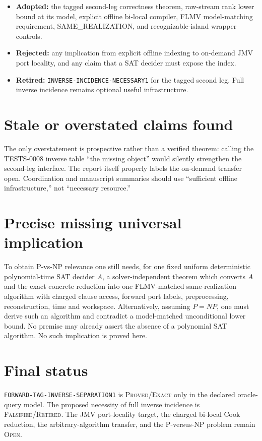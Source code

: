 \documentclass[11pt]{article}
\newcommand{\status}[1]{\textsc{#1}}
\begin{document}
\begin{itemize}[leftmargin=1.5em]
\item \textbf{Adopted:} the tagged second-leg correctness theorem, raw-stream
rank lower bound at its model, explicit offline bi-local compiler, FLMV
model-matching requirement, SAME\_REALIZATION, and recognizable-island
wrapper controls.
\item \textbf{Rejected:} any implication from explicit offline indexing to
on-demand JMV port locality, and any claim that a SAT decider must expose the
index.
\item \textbf{Retired:} \texttt{INVERSE-INCIDENCE-NECESSARY1} for the tagged
second leg.  Full inverse incidence remains optional useful infrastructure.
\end{itemize}

\section{Stale or overstated claims found}

The only overstatement is prospective rather than a verified theorem:
calling the TESTS-0008 inverse table ``the missing object'' would silently
strengthen the second-leg interface.  The report itself properly labels the
on-demand transfer open.  Coordination and manuscript summaries should use
``sufficient offline infrastructure,'' not ``necessary resource.''

\section{Precise missing universal implication}

To obtain P-vs-NP relevance one still needs, for one fixed uniform
deterministic polynomial-time SAT decider $A$, a solver-independent theorem
which converts $A$ and the exact concrete reduction into one FLMV-matched
same-realization algorithm with charged clause access, forward port labels,
preprocessing, reconstruction, time and workspace.  Alternatively, assuming
$P=NP$, one must derive such an algorithm and contradict a model-matched
unconditional lower bound.  No premise may already assert the absence of a
polynomial SAT algorithm.  No such implication is proved here.

\section*{Final status}

\texttt{FORWARD-TAG-INVERSE-SEPARATION1} is \status{Proved/Exact} only in
the declared oracle-query model.  The proposed necessity of full inverse
incidence is \status{Falsified/Retired}.  The JMV port-locality target, the
charged bi-local Cook reduction, the arbitrary-algorithm transfer, and the
P-versus-NP problem remain \status{Open}.

\end{document}

